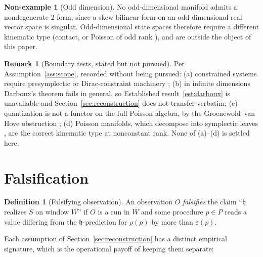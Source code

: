 \documentclass[10pt,a4paper]{article}
\theoremstyle{plain}
\theoremstyle{definition}
\newtheorem{definition}[theorem]{Definition}
\newtheorem{nonexample}[theorem]{Non-example}
\newtheorem{remark}[theorem]{Remark}
\begin{document}
\begin{nonexample}[Odd dimension]
\label{nonex:odd}
No odd-dimensional manifold admits a nondegenerate $2$-form, since a skew bilinear form on an odd-dimensional real vector space is singular. Odd-dimensional state spaces therefore require a different kinematic type (contact, or Poisson of odd rank \cite{Weinstein1983}), and are outside the object of this paper.
\end{nonexample}

\begin{remark}[Boundary tests, stated but not pursued]
\label{rem:boundary}
Per Assumption~\ref{ass:scope}, recorded without being pursued: (a) constrained systems require presymplectic or Dirac-constraint machinery \cite{Dirac1964}; (b) in infinite dimensions Darboux's theorem fails in general, so Established result~\ref{est:darboux} is unavailable and Section~\ref{sec:reconstruction} does not transfer verbatim; (c) quantization is not a functor on the full Poisson algebra, by the Groenewold--van Hove obstruction \cite{Groenewold1946}; (d) Poisson manifolds, which decompose into symplectic leaves \cite{Weinstein1983}, are the correct kinematic type at nonconstant rank. None of (a)--(d) is settled here.
\end{remark}

\section{Falsification}
\label{sec:falsification}

\begin{definition}[Falsifying observation]
\label{def:falsify}
An observation $O$ \emph{falsifies} the claim ``$\mathfrak{h}$ realizes $S$ on window $W$'' if $O$ is a run in $W$ and some procedure $p \in P$ reads a value differing from the $\mathfrak{h}$-prediction for $\rho(p)$ by more than $\varepsilon(p)$.
\end{definition}

Each assumption of Section~\ref{sec:reconstruction} has a distinct empirical signature, which is the operational payoff of keeping them separate:
\end{document}
